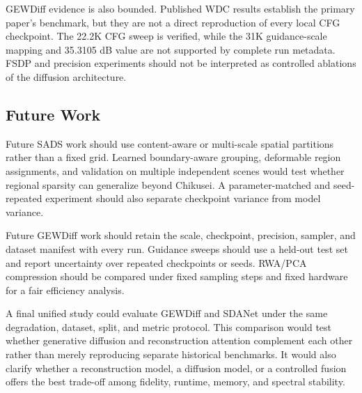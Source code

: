 \documentclass[10pt,twocolumn,letterpaper]{article}
\begin{document}
GEWDiff evidence is also bounded. Published WDC results establish the primary paper's benchmark, but they are not a direct reproduction of every local CFG checkpoint. The 22.2K CFG sweep is verified, while the 31K guidance-scale mapping and 35.3105 dB value are not supported by complete run metadata. FSDP and precision experiments should not be interpreted as controlled ablations of the diffusion architecture.

\subsection{Future Work}

Future SADS work should use content-aware or multi-scale spatial partitions rather than a fixed grid. Learned boundary-aware grouping, deformable region assignments, and validation on multiple independent scenes would test whether regional sparsity can generalize beyond Chikusei. A parameter-matched and seed-repeated experiment should also separate checkpoint variance from model variance.

Future GEWDiff work should retain the scale, checkpoint, precision, sampler, and dataset manifest with every run. Guidance sweeps should use a held-out test set and report uncertainty over repeated checkpoints or seeds. RWA/PCA compression should be compared under fixed sampling steps and fixed hardware for a fair efficiency analysis.

A final unified study could evaluate GEWDiff and SDANet under the same degradation, dataset, split, and metric protocol. This comparison would test whether generative diffusion and reconstruction attention complement each other rather than merely reproducing separate historical benchmarks. It would also clarify whether a reconstruction model, a diffusion model, or a controlled fusion offers the best trade-off among fidelity, runtime, memory, and spectral stability.
\end{document}
